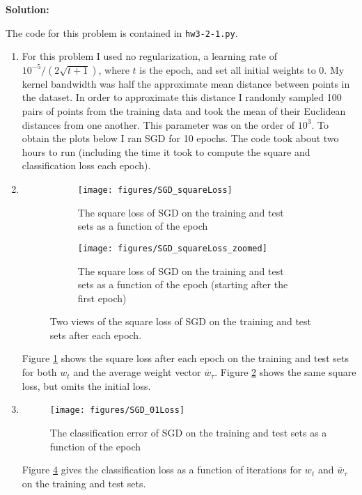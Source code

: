 \documentclass{article}
\newcommand{\solution}{\textbf{\vskip 0.2cm \large Solution:\\}}
\begin{document}
\solution

The code for this problem is contained in {\tt hw3-2-1.py}.


\begin{enumerate}
	\item For this problem I used no regularization, a learning rate of $10^{-5} / (2\sqrt{t+1})$, where $t$ is the epoch, and set all initial weights to 0. My kernel bandwidth was half the approximate mean distance between points in the dataset. In order to approximate this distance I randomly sampled 100 pairs of points from the training data and took the mean of their Euclidean distances from one another. This parameter was on the order of $10^3$. To obtain the plots below I ran SGD for 10 epochs. The code took about two hours to run (including the time it took to compute the square and classification loss each epoch).

	\item
	\begin{figure}
		\centering
		\begin{subfigure}{0.49\textwidth}
			\centering
			\texttt{[image: figures/SGD\_squareLoss]}
			\caption{The square loss of SGD on the training and test sets as a function of the epoch}
			\label{fig:SGD_squareLoss_overview}
		\end{subfigure}
		\begin{subfigure}{0.49\textwidth}
			\centering
			\texttt{[image: figures/SGD\_squareLoss\_zoomed]}
			\caption{The square loss of SGD on the training and test sets as a function of the epoch (starting after the first epoch)}
			\label{fig:SGD_squareLoss_zoomed}
		\end{subfigure}
		\caption{Two views of the square loss of SGD on the training and test sets after each epoch.}
		\label{fig:SGD_squareloss}
	\end{figure}
	Figure \ref{fig:SGD_squareLoss_overview} shows the square loss after each epoch on the training and test sets for both $w_t$ and the average weight vector $\overline w_\tau$. Figure \ref{fig:SGD_squareLoss_zoomed} shows the same square loss, but omits the initial loss.

	\item
	\begin{figure}
		\centering
		\texttt{[image: figures/SGD\_01Loss]}
		\caption{The classification error of SGD on the training and test sets as a function of the epoch} 
		\label{fig:figures/SGD_01Loss}
	\end{figure}
	Figure \ref{fig:figures/SGD_01Loss} gives the classification loss as a function of iterations for $w_t$ and $\overline w_\tau$ on the training and test sets.


\end{enumerate}
\end{document}
